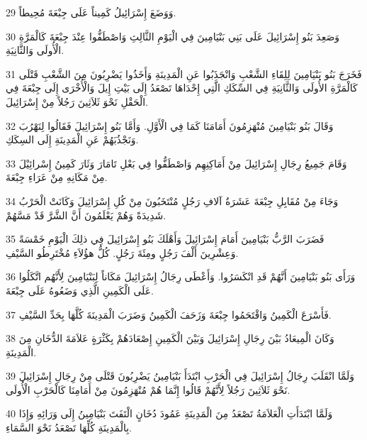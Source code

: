 \par 29 وَوَضَعَ إِسْرَائِيلُ كَمِيناً عَلَى جِبْعَةَ مُحِيطاً.
\par 30 وَصَعِدَ بَنُو إِسْرَائِيلَ عَلَى بَنِي بَنْيَامِينَ فِي الْيَوْمِ الثَّالِثِ وَاصْطَفُّوا عِنْدَ جِبْعَةَ كَالْمَرَّةِ الْأُولَى وَالثَّانِيَةِ.
\par 31 فَخَرَجَ بَنُو بَنْيَامِينَ لِلِقَاءِ الشَّعْبِ وَانْجَذَبُوا عَنِ الْمَدِينَةِ وَأَخَذُوا يَضْرِبُونَ مِنَ الشَّعْبِ قَتْلَى كَالْمَرَّةِ الأُولَى وَالثَّانِيَةِ فِي السِّكَكِ الَّتِي إِحْدَاهَا تَصْعَدُ إِلَى بَيْتِ إِيلَ وَالْأُخْرَى إِلَى جِبْعَةَ فِي الْحَقْلِ نَحْوَ ثَلاَثِينَ رَجُلاً مِنْ إِسْرَائِيلَ.
\par 32 وَقَالَ بَنُو بَنْيَامِينَ مُنْهَزِمُونَ أَمَامَنَا كَمَا فِي الْأَوَّلِ. وَأَمَّا بَنُو إِسْرَائِيلَ فَقَالُوا لِنَهْرُبَ وَنَجْذُبَهُمْ عَنِ الْمَدِينَةِ إِلَى السِكَكِ.
\par 33 وَقَامَ جَمِيعُ رِجَالِ إِسْرَائِيلَ مِنْ أَمَاكِنِهِم وَاصْطَفُّوا فِي بَعْلِ تَامَارَ وَثَارَ كَمِينُ إِسْرائِيْلَ مِنْ مَكَانِهِ مِنْ عَرَاءِ جِبْعَةَ.
\par 34 وَجَاءَ مِنْ مُقَابِلِ جِبْعَةَ عَشَرَةُ آلافِ رَجُلٍ مُنْتَخَبُونَ مِنْ كُلِ إِسْرَائِيلَ وَكَانَتْ الْحَرْبُ شَدِيدَةً وَهُمْ يَعْلَمُونَ أَنَّ الشَّرَّ قَدْ مَسَّهُمْ.
\par 35 فَضَرَبَ الرَّبُّ بَنْيَامِينَ أَمَامَ إِسْرَائِيلَ وَأَهْلَكَ بَنُو إِسْرَائِيلَ فِي ذلِكَ الْيَوْمِ خَمْسَةً وَعِشْرِينَ أَلْفَ رَجُلٍ ومِئَةَ رَجُلٍ. كُلُّ هؤُلاَءِ مُخْتَرِطُو السَّيْفِ.
\par 36 وَرَأَى بَنُو بَنْيَامِينَ أَنَّهُمْ قَدِ انْكَسَرُوا. وَأَعْطَى رِجَالُ إِسْرَائِيلَ مَكَاناً لِبَنْيَامِينَ لِأَنَّهُم اتَّكَلُوا عَلَى الْكَمِينِ الَّذِي وَضَعُوهُ عَلَى جِبْعَةَ.
\par 37 فَأَسْرَعَ الْكَمِينُ وَاقْتَحَمُوا جِبْعَةَ وَزَحَفَ الْكَمِينُ وَضَرَبَ الْمَدِينَةَ كُلَّهَا بِحَدِّ السَّيْفِ.
\par 38 وَكَانَ الْمِيعَادُ بَيْنَ رِجَالِ إِسْرَائِيلَ وَبَيْنَ الْكَمِينِ إِصْعَادَهُمْ بِكَثْرَةٍ عَلاَمَةَ الدُّخَانِ مِنَ الْمَدِينَةِ.
\par 39 وَلَمَّا انْقَلَبَ رِجَالُ إِسْرَائِيلَ فِي الْحَرْبِ ابْتَدَأَ بَنْيَامِينُ يَضْرِبُونَ قَتْلَى مِنْ رِجَالِ إِسْرَائِيلَ نَحْوَ ثَلاَثِينَ رَجُلاً لِأَنَّهُمْ قَالُوا إِنَّمَا هُمْ مُنْهَزِمُونَ مِنْ أَمَامِنَا كَالْحَرْبِ الْأُولَى.
\par 40 وَلَمَّا ابْتَدَأَتِ الْعَلاَمَةُ تَصْعَدُ مِنَ الْمَدِينَةِ عَمُودَ دُخَانٍ الْتَفَتَ بَنْيَامِينُ إِلَى وَرَائِهِ وَإِذَا بِالْمَدِينَةِ كُلِّهَا تَصْعَدُ نَحْوَ السَّمَاءِ.
